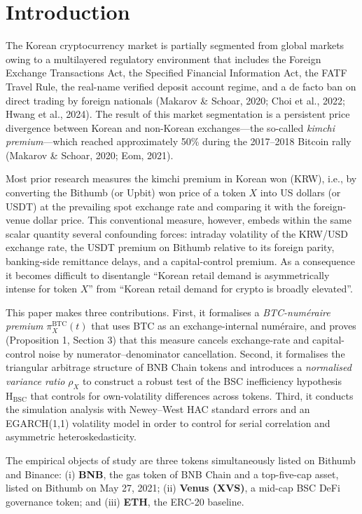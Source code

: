\documentclass[11pt,a4paper]{article}
\begin{document}
\section{Introduction}

The Korean cryptocurrency market is partially segmented from global markets owing to a multilayered
regulatory environment that includes the Foreign Exchange Transactions Act, the Specified Financial
Information Act, the FATF Travel Rule, the real-name verified deposit account regime, and a de facto
ban on direct trading by foreign nationals (Makarov \& Schoar, 2020; Choi et al., 2022; Hwang et al.,
2024). The result of this market segmentation is a persistent price divergence between Korean and
non-Korean exchanges---the so-called \emph{kimchi premium}---which reached approximately 50\% during
the 2017--2018 Bitcoin rally (Makarov \& Schoar, 2020; Eom, 2021).

Most prior research measures the kimchi premium in Korean won (KRW), i.e., by converting the Bithumb
(or Upbit) won price of a token $X$ into US dollars (or USDT) at the prevailing spot exchange rate and
comparing it with the foreign-venue dollar price. This conventional measure, however, embeds within
the same scalar quantity several confounding forces: intraday volatility of the KRW/USD exchange rate,
the USDT premium on Bithumb relative to its foreign parity, banking-side remittance delays, and a
capital-control premium. As a consequence it becomes difficult to disentangle ``Korean retail demand
is asymmetrically intense for token $X$'' from ``Korean retail demand for crypto is broadly elevated''.

This paper makes three contributions. First, it formalises a \emph{BTC-num\'eraire premium}
$\pi^{\text{BTC}}_X(t)$ that uses BTC as an exchange-internal num\'eraire, and proves
(Proposition 1, Section 3) that this measure cancels exchange-rate and capital-control noise by
numerator--denominator cancellation. Second, it formalises the triangular arbitrage structure of
BNB Chain tokens and introduces a \emph{normalised variance ratio} $\rho_X$ to construct a robust
test of the BSC inefficiency hypothesis $\mathrm{H_{BSC}}$ that controls for own-volatility
differences across tokens. Third, it conducts the simulation analysis with Newey--West HAC standard
errors and an EGARCH(1,1) volatility model in order to control for serial correlation and asymmetric
heteroskedasticity.

The empirical objects of study are three tokens simultaneously listed on Bithumb and Binance:
(i) \textbf{BNB}, the gas token of BNB Chain and a top-five-cap asset, listed on Bithumb on May 27,
2021; (ii) \textbf{Venus (XVS)}, a mid-cap BSC DeFi governance token; and (iii) \textbf{ETH}, the
ERC-20 baseline.
\end{document}
